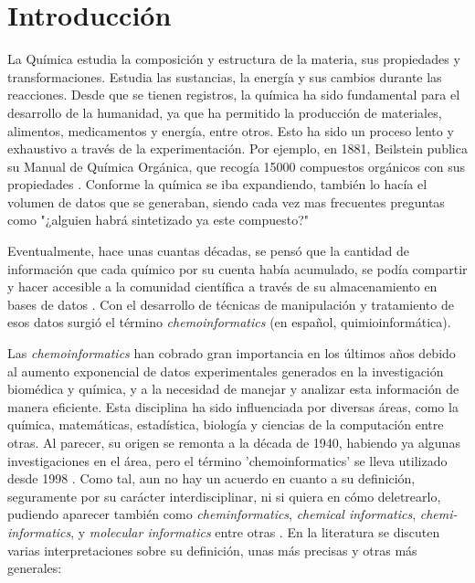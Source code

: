 \chapter{Introducción}


La Química estudia la composición y estructura de la materia, sus propiedades y transformaciones. Estudia las sustancias, la energía y sus cambios durante las reacciones. Desde que se tienen registros, la química ha sido fundamental para el desarrollo de la humanidad, ya que ha permitido la producción de materiales, alimentos, medicamentos y energía, entre otros. Esto ha sido un proceso lento y exhaustivo a través de la experimentación. Por ejemplo, en 1881, Beilstein publica su Manual de Química Orgánica, que recogía 15000 compuestos orgánicos con sus propiedades \cite{handbook_1881}. Conforme la química se iba expandiendo, también lo hacía el volumen de datos que se generaban, siendo cada vez mas frecuentes preguntas como "¿alguien habrá sintetizado ya este compuesto?" \cite{applied_chemo_intro}

Eventualmente, hace unas cuantas décadas, se pensó que la cantidad de información que cada químico por su cuenta había acumulado, se podía compartir y hacer accesible a la comunidad científica a través de su almacenamiento en bases de datos \cite{chemo_a_textbook}. Con el desarrollo de técnicas de manipulación y tratamiento de esos datos surgió el término \emph{chemoinformatics} (en español, quimioinformática).

Las \emph{chemoinformatics} han cobrado gran importancia en los últimos años debido al aumento exponencial de datos experimentales generados en la investigación biomédica y química, y a la necesidad de manejar y analizar esta información de manera eficiente.
Esta disciplina ha sido influenciada por diversas áreas, como la química, matemáticas, estadística, biología y ciencias de la computación entre otras. Al parecer, su origen se remonta a la década de 1940, habiendo ya algunas investigaciones en el área, pero el término 'chemoinformatics' se lleva utilizado desde 1998 \cite{leach_introduction_2007}. Como tal, aun no hay un acuerdo en cuanto a su definición, seguramente por su carácter interdisciplinar, ni si quiera en cómo deletrearlo, pudiendo aparecer también como \emph{cheminformatics}, \emph{chemical informatics}, \emph{chemi-informatics}, y \emph{molecular informatics} entre otras \cite{leach_introduction_2007, brown_chemoinformaticsintroduction_2009}. En la literatura se discuten varias interpretaciones sobre su definición, unas más precisas y otras más generales: \cite{leach_introduction_2007, basic_overview_chemo, brown_chemoinformaticsintroduction_2009, chemo_a_textbook}


